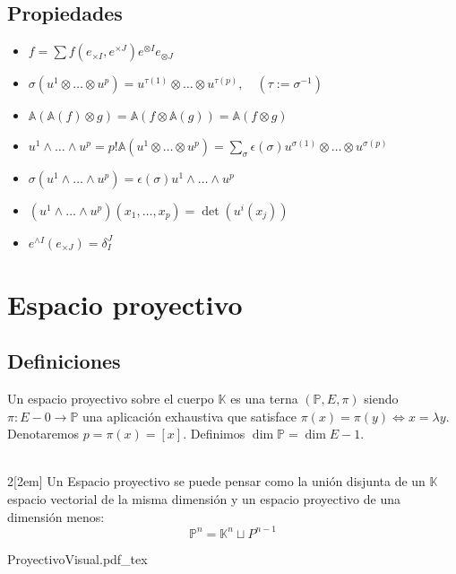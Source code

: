 \documentclass{myclass}
\newcommand{\incfig}[1]{%
  \def\svgwidth{0.9\columnwidth}
  {#1.pdf_tex}
}
\newcommand{\A}{\mathcal{A}}
\newcommand{\K}{\mathbb{K}}
\renewcommand{\P}{\mathbb{P}}
\renewcommand{\A}{\mathbb{A}}
\begin{document}
\subsection{Propiedades}
\begin{itemize}
    \item $f=\sum f(e_{\times I}, e^{\times J})e^{\otimes I}e_{\otimes J}$
    \item $\sigma (u^1\otimes \ldots \otimes u^p) = u^{\tau(1)}\otimes \ldots \otimes u^{\tau(p)}, \quad (\tau := \sigma^{-1})$
    \item $\A(\A(f)\otimes g) = \A(f\otimes\A(g)) = \A(f\otimes g)$
    \item $u^1\wedge \ldots \wedge u^p = p!\A(u^1\otimes \ldots \otimes u^p) = \sum_\sigma \epsilon(\sigma)u^{\sigma(1)}\otimes \ldots \otimes u^{\sigma(p)}$
    \item $\sigma(u^1\wedge \ldots \wedge u^p) = \epsilon(\sigma)u^1\wedge \ldots \wedge u^p$
    \item $(u^1\wedge \ldots \wedge u^p)(x_1, \ldots, x_p) = \det (u^i(x_j))$
    \item $e^{\wedge I}(e_{\times J}) = \delta_I^J$
\end{itemize}




\section{Espacio proyectivo}
\subsection{Definiciones}
Un espacio proyectivo sobre el cuerpo $\K$ es una terna $(\P, E, \pi)$ siendo $\pi:E-{0}\to \P$ una aplicación exhaustiva que satisface $\pi(x)=\pi(y)\iff x=\lambda y$.\\
Denotaremos $p = \pi(x) = [x]$. Definimos $\dim\P = \dim E -1$. \\
\\

\begin{multicols}{2}[\columnsep2em] 
Un Espacio proyectivo se puede pensar como la unión disjunta de un $\K$ espacio vectorial de la misma dimensión y un espacio proyectivo de una dimensión menos:
$$
\P^n = \K^n \sqcup P^{n-1}
$$
\columnbreak


    \incfig{ProyectivoVisual}

\end{multicols}
\end{document}
